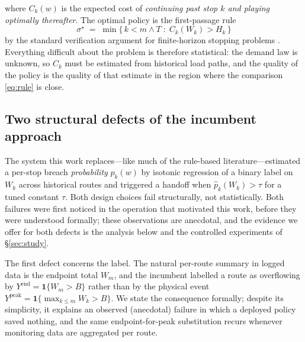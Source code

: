 \documentclass[preprint,authoryear,12pt]{elsarticle}
\theoremstyle{definition}
\theoremstyle{remark}
\begin{document}
where $C_k(w)$ is the expected cost of \emph{continuing past stop $k$
and playing optimally thereafter}. The optimal policy is the
first-passage rule
\begin{equation}\label{eq:rule}
  \sigma^\star \;=\; \min\{\,k < m \wedge T \;:\; C_k(W_k) > H_k \,\}
\end{equation}
by the standard verification argument for finite-horizon stopping
problems \citep{chow1971great,peskir2006optimal}. Everything difficult
about the problem is therefore statistical: the demand law is unknown,
so $C_k$ must be estimated from historical load paths, and the quality
of the policy is the quality of that estimate in the region where the
comparison \eqref{eq:rule} is close.

\subsection{Two structural defects of the incumbent approach}
\label{sec:defects}

The system this work replaces---like much of the rule-based
literature---estimated a per-stop breach \emph{probability}
$p_k(w)$ by isotonic regression of a binary label on $W_k$ across
historical routes and triggered a handoff when
$\hat p_k(W_k) > \tau$ for a tuned constant $\tau$. Both design choices
fail structurally, not statistically. Both failures were first noticed
in the operation that motivated this work, before they were understood
formally; these observations are anecdotal, and the evidence we offer
for both defects is the analysis below and the controlled experiments of
\S\ref{sec:study}.

The first defect concerns the label. The natural per-route summary in
logged data is the endpoint total $W_m$, and the incumbent labelled a
route as overflowing by $Y^{\mathrm{end}} = \mathbf 1\{W_m > B\}$ rather
than by the physical event
$Y^{\mathrm{peak}} = \mathbf 1\{\max_{k \le m} W_k > B\}$. We state the
consequence formally; despite its simplicity, it explains an observed
(anecdotal) failure in which a deployed policy saved nothing, and the
same endpoint-for-peak substitution recurs whenever monitoring data are
aggregated per route.
\end{document}
